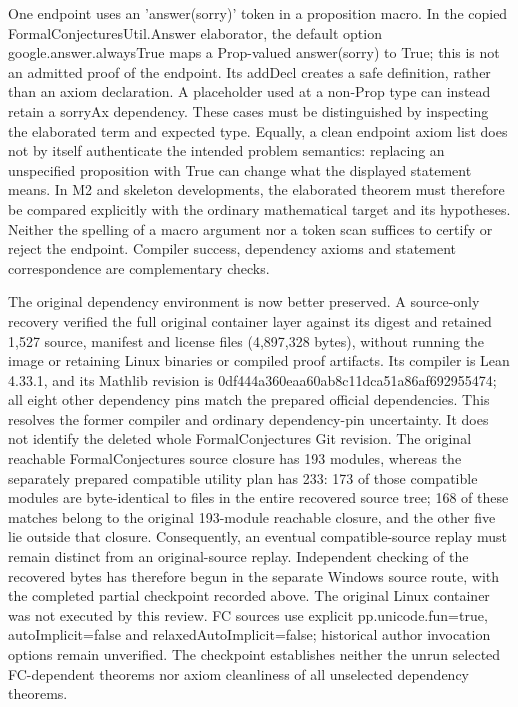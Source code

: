 \documentclass[11pt,a4paper]{article}
\begin{document}
One endpoint uses an 'answer(sorry)' token in a proposition macro. In the copied FormalConjecturesUtil.Answer elaborator, the default option google.answer.alwaysTrue maps a Prop-valued answer(sorry) to True; this is not an admitted proof of the endpoint. Its addDecl creates a safe definition, rather than an axiom declaration. A placeholder used at a non-Prop type can instead retain a sorryAx dependency. These cases must be distinguished by inspecting the elaborated term and expected type. Equally, a clean endpoint axiom list does not by itself authenticate the intended problem semantics: replacing an unspecified proposition with True can change what the displayed statement means. In M2 and skeleton developments, the elaborated theorem must therefore be compared explicitly with the ordinary mathematical target and its hypotheses. Neither the spelling of a macro argument nor a token scan suffices to certify or reject the endpoint. Compiler success, dependency axioms and statement correspondence are complementary checks.

The original dependency environment is now better preserved. A source-only recovery verified the full original container layer against its digest and retained 1,527 source, manifest and license files (4,897,328 bytes), without running the image or retaining Linux binaries or compiled proof artifacts. Its compiler is Lean 4.33.1, and its Mathlib revision is 0df444a360eaa60ab8c11dca51a86af692955474; all eight other dependency pins match the prepared official dependencies. This resolves the former compiler and ordinary dependency-pin uncertainty. It does not identify the deleted whole FormalConjectures Git revision. The original reachable FormalConjectures source closure has 193 modules, whereas the separately prepared compatible utility plan has 233: 173 of those compatible modules are byte-identical to files in the entire recovered source tree; 168 of these matches belong to the original 193-module reachable closure, and the other five lie outside that closure. Consequently, an eventual compatible-source replay must remain distinct from an original-source replay. Independent checking of the recovered bytes has therefore begun in the separate Windows source route, with the completed partial checkpoint recorded above. The original Linux container was not executed by this review. FC sources use explicit pp.unicode.fun=true, autoImplicit=false and relaxedAutoImplicit=false; historical author invocation options remain unverified. The checkpoint establishes neither the unrun selected FC-dependent theorems nor axiom cleanliness of all unselected dependency theorems.
\end{document}
